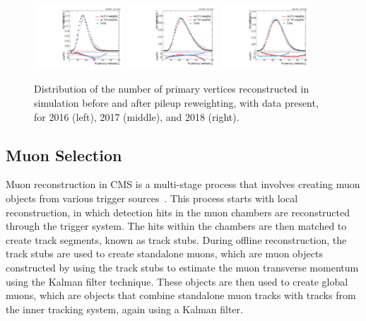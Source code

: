 \begin{figure}[htbp]
  \centering
  \includegraphics[width=0.3\textwidth]{fig/eventSelection/PUrewN_0_2016_nVert.pdf}
  \includegraphics[width=0.3\textwidth]{fig/eventSelection/PUrewN_0_2017_nVert.pdf}
  \includegraphics[width=0.3\textwidth]{fig/eventSelection/PUrewN_0_2018_nVert.pdf}
  \caption{
    Distribution of the number of primary vertices reconstructed in simulation before and after pileup reweighting, with data present, for 2016 (left), 2017 (middle), and 2018 (right).
  }
  \label{fig:PUreweight}
\end{figure}

\subsection{Muon Selection}
\label{subsec:muonSelect}

Muon reconstruction in CMS is a multi-stage process that involves creating muon objects from various trigger sources~\cite{Sirunyan_2018_CMS,Sirunyan_2020}. %
This process starts with local reconstruction, in which detection hits in the muon chambers are reconstructed through the trigger system.
The hits within the chambers are then matched to create track segments, known as track stubs.
During offline reconstruction, the track stubs are used to create standalone muons, which are muon objects constructed by using the track stubs to estimate the muon transverse momentum using the Kalman filter technique.
These objects are then used to create global muons, which are objects that combine standalone muon tracks with tracks from the inner tracking system, again using a Kalman filter.

